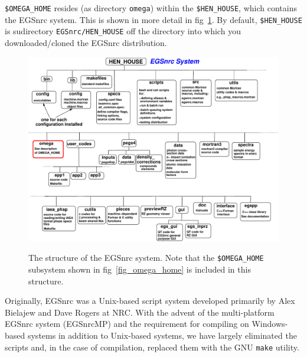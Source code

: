 \documentclass[12pt,twoside]{article}
\begin{document}
{\tt \$OMEGA\_HOME} resides (as directory {\tt omega})
within the {\tt \$HEN\_HOUSE}, which contains the EGSnrc system.
This is shown in more detail in fig~\ref{fig_hen_house}.  By default,
{\tt \$HEN\_HOUSE} is sudirectory {\tt EGSnrc/HEN\_HOUSE} off the
directory into which you downloaded/cloned the EGSnrc distribution.
\begin{figure}[hbp]
\begin{center}
\leavevmode
\mbox{}
\hspace*{-1cm}
\includegraphics[width=19cm]{figures/hen_house}
\caption[Structure of EGSnrc directory, {\em i.e.~} the {\tt \$HEN\_HOUSE}.]
{The structure of the
EGSnrc system. Note that the {\tt \$OMEGA\_HOME} subsystem shown in
fig~\ref{fig_omega_home} is included in this structure.
}
 
\label{fig_hen_house}
\end{center}
\end{figure}
Originally, EGSnrc was a Unix-based script system developed primarily by
Alex Bielajew and Dave Rogers at NRC.  With the advent of the multi-platform
EGSnrc system (EGSnrcMP\cite{Ka03}) and the requirement for compiling on
Windows-based systems in addition to Unix-based systems, we have largely
eliminated the scripts and, in the case of compilation, replaced them with the
GNU {\tt make} utility.
\end{document}
